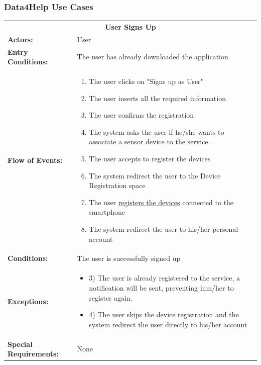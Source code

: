 {\color{Blue}\subsubsection{Data4Help Use Cases}}
\begin{table}[htb]
	\centering
	{\renewcommand{\arraystretch}{2}%
		\begin{tabular}{|@{\hspace{2em}} p{4cm} @{}| p{11cm} @{\qquad}| }
			\cline{1-2}
			\multicolumn{2}{|c|}{\textbf{User Signs Up}} \\ \cline{1-2}
			\textbf{Actors:} & User \\ \cline{1-2}
			\textbf{Entry Conditions:} & The user has already downloaded the application \\ \cline{1-2}
			\textbf{Flow of Events:} & 
			\begin{enumerate}[itemsep=-0.2em, topsep=0em]
				\item The user clicks on "Signs up as User"
				\item The user inserts all the required information
				\item The user confirms the registration
				\item The system asks the user if he/she wants to 
				associate a sensor device to the service.
				\item The user accepts to register the devices
				\item The system redirect the user to the Device Registration space
				\item The user \underline{registers the devices} connected to the smartphone
				\item The system redirect the user to his/her personal account
			\end{enumerate}\\ \cline{1-2}
			\textbf{ Conditions:} & The user is successfully signed up\\ \cline{1-2}
			\textbf{Exceptions:} & 
			\begin{itemize}[itemsep=-0.2em, topsep=0em]
				\item 3) The user is already registered to the service, a notification will be sent, preventing him/her to register again.
				\item 4) The user skips the device registration and the system redirect the user directly to his/her account
			\end{itemize} \\ \cline{1-2}
			\small{\textbf{Special Requirements:}} & None \\ \hline
	\end{tabular}} \quad
\end{table}

